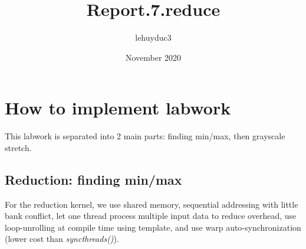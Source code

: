 \documentclass[14pt]{article}
\title{Report.7.reduce}
\author{lehuyduc3 }
\date{November 2020}
\begin{document}
\maketitle

\section{How to implement labwork}
This labwork is separated into 2 main parts: finding min/max, then grayscale stretch.

\subsection{Reduction: finding min/max}
For the reduction kernel, we use shared memory, sequential addressing with little bank conflict, let one thread process multiple input data to reduce overhead, use loop-unrolling at compile time using template, and use warp auto-synchronization (lower cost than \textit{syncthreads()}).
\end{document}
